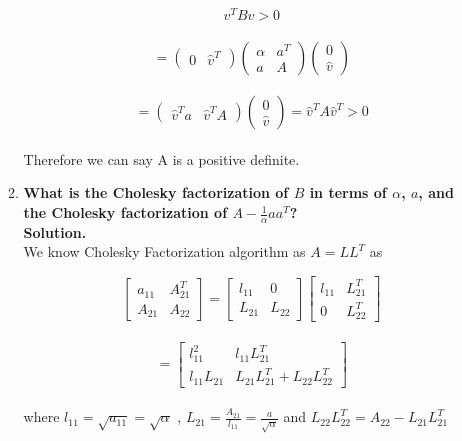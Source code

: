\documentclass[12pt, oneside]{article}   	%
\begin{document}
\begin{enumerate}
\begin{enumerate}
	$$v^{T}Bv >0$$\\
	$$
	=(\begin{array}{cc} 0& \hat{v}^T
	\end{array}) (\begin{array}{cc} \alpha & a^T \\
	a & A
	\end{array})(\begin{array}{c} 0\\ \hat{v}
	\end{array})
	$$\\
	$$
	=(\begin{array}{cc} \hat{v}^Ta & \hat{v}^TA
	\end{array})(\begin{array}{c} 0\\ \hat{v}
	\end{array})= \hat{v}^TA\hat{v}^T>0
	$$\\

	
	Therefore we can say A is a positive definite.
	
	\item \textbf{What is the Cholesky factorization of $B$ in terms of $\alpha$, $a$, and the Cholesky factorization of $A - \frac{1}{\alpha} a a^T$?}\\
	
	\textbf{Solution.}\\
	
	We know Cholesky Factorization algorithm as $A=LL^{T}$ as 
	
	$$
	\left [\begin{array}{cc} a_{11} & A_{21}^{T}\\ A_{21}& A_{22} \end{array}\right ]= \left [\begin{array}{cc} l_{11}& 0\\L_{21}&  L_{22} \end{array}\right ]
	\left[\begin{array}{cc}l_{11}& L_{21}^{T}\\ 0& L_{22}^{T} \end{array}\right]
	$$ \\
	$$=
	\left[\begin{array}{cc}l_{11}^{2}& l_{11}L_{21}^{T}\\ l_{11}L_{21}& L_{21}L_{21}^{T}+L_{22} L_{22}^{T} \end{array}\right]
	$$ \\
	where $l_{11}= \sqrt{a_{11}}=\sqrt{\alpha} $ , $L_{21}= \frac{A_{21}}{l_{11}}=\frac{a}{\sqrt{\alpha}}$ and $L_{22} L_{22}^{T}=A_{22}- L_{21} L_{21}^{T}$\\
	

\end{enumerate}
\end{enumerate}
\end{document}
